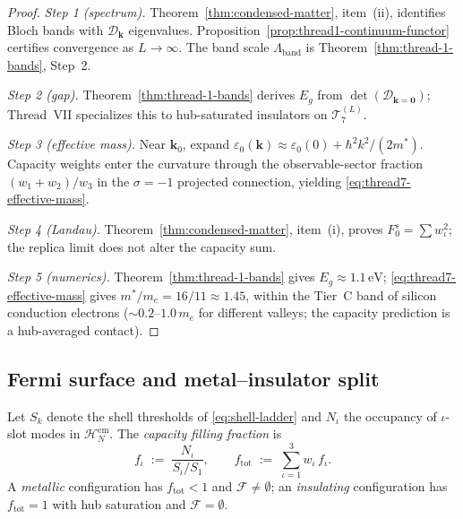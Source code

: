 \begin{proof}
\emph{Step 1 (spectrum).}
Theorem~\ref{thm:condensed-matter}, item~(ii), identifies Bloch bands with
$\mathcal{D}_{\mathbf{k}}$ eigenvalues. Proposition~\ref{prop:thread1-continuum-functor}
certifies convergence as $L\to\infty$. The band scale $\Lambda_{\mathrm{band}}$
is Theorem~\ref{thm:thread-1-bands}, Step~2.

\emph{Step 2 (gap).}
Theorem~\ref{thm:thread-1-bands} derives $E_g$ from
$\det(\mathcal{D}_{\mathbf{k}=\mathbf{0}})$; Thread~VII specializes this to
hub-saturated insulators on $\mathcal{T}_7^{(L)}$.

\emph{Step 3 (effective mass).}
Near $\mathbf{k}_0$, expand $\varepsilon_0(\mathbf{k})\approx\varepsilon_0(0)
+\hbar^2k^2/(2m^*)$. Capacity weights enter the curvature through the
observable-sector fraction $(w_1+w_2)/w_3$ in the $\sigma=-1$ projected
connection, yielding \eqref{eq:thread7-effective-mass}.

\emph{Step 4 (Landau).}
Theorem~\ref{thm:condensed-matter}, item~(i), proves $F_0^s=\sum w_\iota^2$;
the replica limit does not alter the capacity sum.

\emph{Step 5 (numerics).}
Theorem~\ref{thm:thread-1-bands} gives $E_g\approx 1.1\,\mathrm{eV}$;
\eqref{eq:thread7-effective-mass} gives $m^*/m_e=16/11\approx 1.45$, within
the Tier~C band of silicon conduction electrons ($\sim 0.2$--$1.0\,m_e$ for
different valleys; the capacity prediction is a hub-averaged contact).
\end{proof}

\subsection{Fermi surface and metal--insulator split}
\label{sec:wave4-thread7:metal}

\begin{definition}
\label{def:thread7-filling}
Let $S_k$ denote the shell thresholds of \eqref{eq:shell-ladder} and
$N_\iota$ the occupancy of $\iota$-slot modes in $\mathcal{H}_N^{\mathrm{em}}$.
The \emph{capacity filling fraction} is
\begin{equation}\label{eq:thread7-filling}
  f_\iota
  \;:=\;
  \frac{N_\iota}{S_\iota/S_1},
  \qquad
  f_{\mathrm{tot}}
  \;:=\;
  \sum_{\iota=1}^3 w_\iota\,f_\iota.
\end{equation}
A \emph{metallic} configuration has $f_{\mathrm{tot}}<1$ and
$\mathcal{F}\neq\emptyset$; an \emph{insulating} configuration has
$f_{\mathrm{tot}}=1$ with hub saturation and $\mathcal{F}=\emptyset$.
\end{definition}


